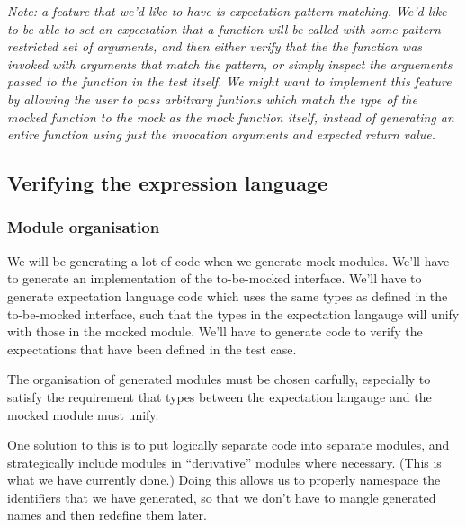 \textit{Note: a feature that we'd like to have is expectation pattern
  matching. We'd like to be able to set an expectation that a function
  will be called with some pattern-restricted set of arguments, and
  then either verify that the the function was invoked with arguments
  that match the pattern, or simply inspect the arguements passed to
  the function in the test itself. We might want to implement this
  feature by allowing the user to pass arbitrary funtions which match
  the type of the mocked function to the mock as the mock function
  itself, instead of generating an entire function using just the
  invocation arguments and expected return value.}

\subsection{Verifying the expression language}
\label{application:mock_impl}

\subsubsection{Module organisation}

We will be generating a lot of code when we generate mock
modules. We'll have to generate an implementation of the to-be-mocked
interface. We'll have to generate expectation language code which uses
the same types as defined in the to-be-mocked interface, such that
the types in the expectation langauge will unify with those in the
mocked module. We'll have to generate code to verify the expectations
that have been defined in the test case.

The organisation of generated modules must be chosen carfully,
especially to satisfy the requirement that types between the
expectation langauge and the mocked module must unify.

One solution to this is to put logically separate code into separate
modules, and strategically include modules in ``derivative'' modules
where necessary. (This is what we have currently done.) Doing this
allows us to properly namespace the identifiers that we have
generated, so that we don't have to mangle generated names and then
redefine them later.

